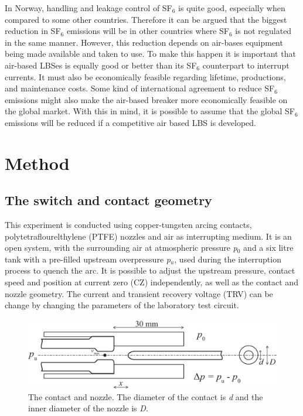 \documentclass[10pt,a4paper,twoside]{article}
\begin{document}
In Norway, handling and leakage control of SF$_6$ is quite good, especially when compared to some other countries. Therefore it can be argued that the biggest reduction in SF$_6$ emissions will be in other countries where SF$_6$ is not regulated in the same manner. However, this reduction depends on air-bases equipment being made available and taken to use. To make this happen it is important that air-based LBSes is equally good or better than its SF$_6$ counterpart to interrupt currents. It must also be economically feasible regarding lifetime, productions, and maintenance costs. Some kind of international agreement to reduce SF$_6$ emissions might also make the air-based breaker more economically feasible on the global market. With this in mind, it is possible to assume that the global SF$_6$ emissions will be reduced if a competitive air based LBS is developed.

\cleardoublepage

\section{Method} \label{sec:Method}

\subsection{The switch and contact geometry} \label{sec:switchAndContactGeo}

This experiment is conducted using copper-tungsten arcing contacts, polytetraflourelthylene (PTFE) nozzles and air as interrupting medium. It is an open system, with the surrounding air at atmospheric pressure \textit{p$_0$} and a six litre tank with a pre-filled upstream overpressure \textit{p$_u$}, used during the interruption process to quench the arc. It is possible to adjust the upstream pressure, contact speed and position at current zero (CZ) independently, as well as the contact and nozzle geometry. The current and transient recovery voltage (TRV) can be change by changing the parameters of the laboratory test circuit.

\begin{figure} [h]
\centering
\includegraphics[scale=0.3]{Bilder/Method/contactSetUpVmax3.png}
\caption{The contact and nozzle. The diameter of the contact is \textit{d} and the inner diameter of the nozzle is \textit{D}.} \label{fig:contactAndNozzle}
\end{figure}
\end{document}
